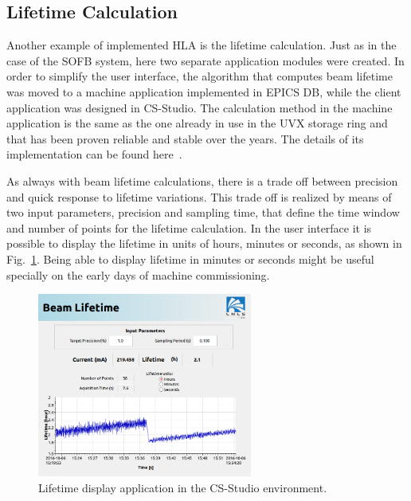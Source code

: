 \subsection{Lifetime Calculation}

Another example of implemented HLA is the lifetime calculation. Just as in the case of the SOFB system, here two separate application modules were created. In order to simplify the user interface, the algorithm that computes beam lifetime was moved to a machine application implemented in EPICS DB, while the client application was designed in CS-Studio. The calculation method in the machine application is the same as the one already in use in the UVX storage ring and that has been proven reliable and stable over the years. The details of its implementation can be found here~\cite{lifetime}.

As always with beam lifetime calculations, there is a trade off between precision and quick response to lifetime variations. This trade off is realized by means of two input parameters, precision and sampling time, that define the time window and number of points for the lifetime calculation. In the user interface it is possible to display the lifetime in units of hours, minutes or seconds, as shown in Fig.~\ref{fig:lifetimef1}. Being able to display lifetime in minutes or seconds might be useful specially on the early days of machine commissioning.

\begin{figure}[!htb]
   \centering
   \includegraphics*[width=200pt]{WEPOPRPO22f2}
   \caption{Lifetime display application in the CS-Studio environment.}
   \label{fig:lifetimef1}
\end{figure}